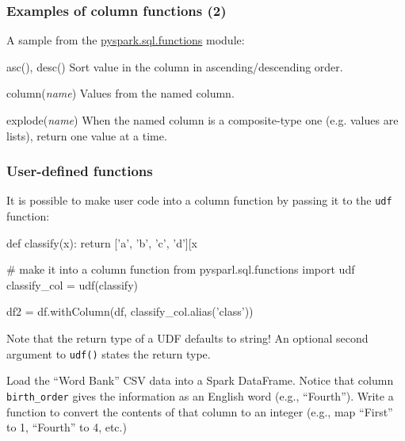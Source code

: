 \documentclass[english,serif,mathserif]{beamer}
\begin{document}
\begin{frame}[fragile]
  \frametitle{Examples of column functions (2)}

  A sample from the
  \href{http://spark.apache.org/docs/1.5.1/api/python/pyspark.sql.html#module-pyspark.sql.functions}{pyspark.sql.functions}
  module:

  \+
  \begin{describe}{asc(), desc()}
    Sort value in the column in ascending/descending order.
  \end{describe}

  \+
  \begin{describe}{column(\emph{name})}
    Values from the named column.
  \end{describe}

  \+
  \begin{describe}{explode(\emph{name})}
    When the named column is a composite-type one (e.g. values are lists),
    return one value at a time.
  \end{describe}
\end{frame}


\begin{frame}[fragile]
  \frametitle{User-defined functions}

  It is possible to make user code into a column function by passing it to
  the \texttt{udf} function:
  \begin{python}
def classify(x):
  return ['a', 'b', 'c', 'd'][x %

# make it into a column function
from pysparl.sql.functions import udf
classify_col = udf(classify)

df2 = df.withColumn(df, classify_col.alias('class'))
  \end{python}

  \+
  Note that the return type of a UDF defaults to string!
  An optional second argument to \texttt{udf()} states the return type.
\end{frame}


\begin{frame}
  \begin{exercise*}[5.A]
    Load the ``Word Bank'' CSV data into a Spark DataFrame.  Notice
    that column \texttt{birth\_order} gives the information as an
    English word (e.g., ``Fourth'').  Write a function to convert the
    contents of that column to an integer (e.g., map ``First'' to 1,
    ``Fourth'' to 4, etc.)
  \end{exercise*}
\end{frame}
\end{document}
